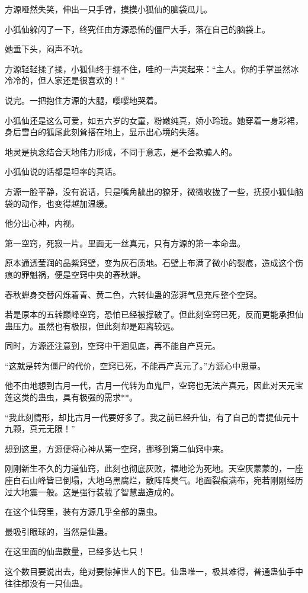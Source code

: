 \begin{this_body}
方源哑然失笑，伸出一只手臂，摸摸小狐仙的脑袋瓜儿。

小狐仙躲闪了一下，终究任由方源恐怖的僵尸大手，落在自己的脑袋上。

她垂下头，闷声不吭。

方源轻轻揉了揉，小狐仙终于绷不住，哇的一声哭起来：“主人。你的手掌虽然冰冷冷的，但人家还是很喜欢的！”

说完。一把抱住方源的大腿，嘤嘤地哭着。

小狐仙还是这么可爱，如五六岁的女童，粉嫩纯真，娇小玲珑。她穿着一身彩裙，身后雪白的狐尾此刻耸搭在地上，显示出心境的失落。

地灵是执念结合天地伟力形成，不同于意志，是不会欺骗人的。

小狐仙说的话都是坦率的真话。

方源一脸平静，没有说话，只是嘴角龇出的獠牙，微微收拢了一些，抚摸小狐仙脑袋的动作，也变得越加温缓。

他分出心神，内视。

第一空窍，死寂一片。里面无一丝真元，只有方源的第一本命蛊。

原本通透莹润的晶紫窍壁，变为灰石质地。石壁上布满了微小的裂痕，造成这个伤痕的罪魁祸，便是空窍中央的春秋蝉。

春秋蝉身交替闪烁着青、黄二色，六转仙蛊的澎湃气息充斥整个空窍。

若是原本的五转巅峰空窍，恐怕已经被撑破了。但此刻空窍已死，反而更能承担仙蛊压力。虽然也有极限，但此刻却是距离较远。

同时，方源还注意到，空窍中干涸见底，再不能自产真元。

“这就是转为僵尸的代价，空窍已死，不能再产真元了。”方源心中思量。

他不由地想到古月一代，古月一代转为血鬼尸，空窍也无法产真元，因此对天元宝莲这类的蛊虫，具有极强的需求**。

“我此刻情形，却比古月一代要好多了。我之前已经升仙，有了自己的青提仙元十九颗，真元无限！”

想到这里，方源便将心神从第一空窍，挪移到第二仙窍中来。

刚刚新生不久的力道仙窍，此刻也彻底灰败，福地沦为死地。天空灰蒙蒙的，一座座白石山峰皆已倒塌，大地乌黑腐烂，散阵阵臭气。地面裂痕满布，宛若刚刚经历过大地震一般。这是强行装载了智慧蛊造成的。

在这个仙窍里，装有方源几乎全部的蛊虫。

最吸引眼球的，当然是仙蛊。

在这里面的仙蛊数量，已经多达七只！

这个数目要说出去，绝对要惊掉世人的下巴。仙蛊唯一，极其难得，普通蛊仙手中往往都没有一只仙蛊。


\end{this_body}
